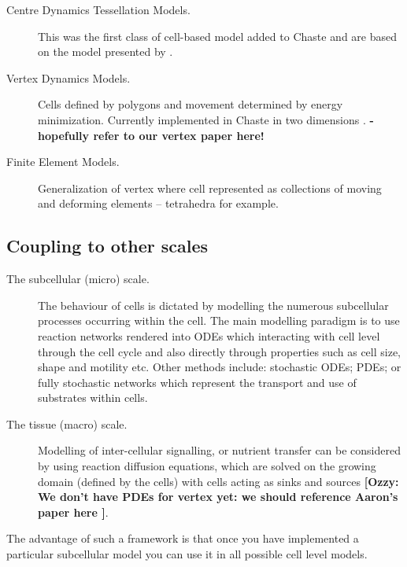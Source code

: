 \documentclass{siamltex}
\newcommand{\authornote}[2]{{\bf [#1: #2]}}
\newcommand{\ozzy}[1]{\authornote{Ozzy}{#1}}
\newcommand{\highlight}[1]{{\color{red} \bf{#1}}}
\begin{document}
\begin{description}
    \item[Centre Dynamics Tessellation Models.] 
    {This was the first class of cell-based model added to Chaste \citep{Leeuwen2009Integrative} and are based on the model presented by \citet{Meineke2001Cell}.}

    \item[Vertex Dynamics Models.] 
    {Cells defined by polygons and movement determined by energy minimization. Currently implemented in Chaste in two dimensions \citep{Osborne2010Hybrid}. 
    \highlight{ - hopefully refer to our vertex paper here!}}

    \item[Finite Element Models.] 
    {Generalization of vertex where cell represented as collections of moving and deforming elements -- tetrahedra for example.}	

\end{description}

\subsection{Coupling to other scales} \label{sec:scales}

\begin{description}
    \item [The subcellular (micro) scale.] 
    {The behaviour of cells is dictated by modelling the numerous subcellular processes occurring within the cell. 
    The main modelling paradigm is to use reaction networks rendered into ODEs which interacting with cell level through the cell cycle and also directly through properties such as cell size, shape and motility etc. 
    Other methods include: stochastic ODEs; PDEs; or fully stochastic networks which represent the transport and use of substrates within cells.}

    \item [The tissue (macro) scale.] 
    {Modelling of inter-cellular signalling, or nutrient transfer can be considered by using reaction diffusion equations, which are solved on the growing domain (defined by the cells) with cells acting as sinks and sources \ozzy{We don't have PDEs for vertex yet: we should reference Aaron's paper here \citep{Smith2011Incorporating}}.}
\end{description}

The advantage of such a framework is that once you have implemented a particular subcellular model you can use it in all possible cell level models.
\end{document}

